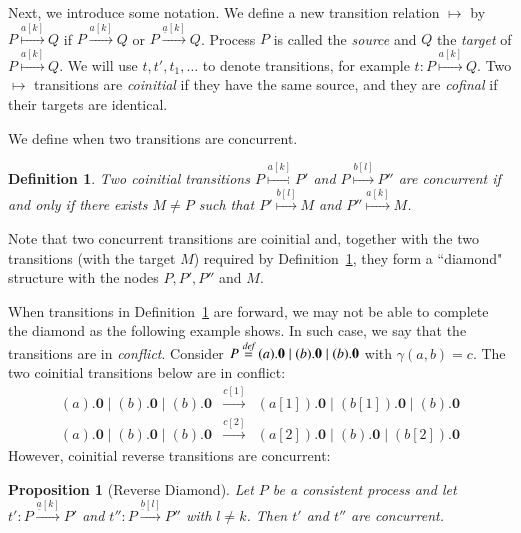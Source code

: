\documentclass[preprint,12pt]{elsarticle}
\newcommand{\paral}{\; \vert \;}
\newcommand{\Nil}{\mathbf{0}}
\newcommand{\bydef}{\stackrel{\emph{def}}{=}}
\newtheorem{definition}{Definition}
\newtheorem{proposition}{Proposition}
\begin{document}
Next, we introduce some notation. We define a new transition relation $ \longmapsto$ by
$P \stackrel{a[k]}{\longmapsto} Q$ if $P \xrightarrow{a[k]} Q$ or $P \xrightarrow{\underline{a}[k]} Q$.
Process $P$ is called the \emph{source} and $Q$ the \emph{target} of $P \stackrel{a[k]}{\longmapsto} Q$. 
We will use $t,t',t_1,\ldots$ to denote transitions, for example $t:P \stackrel{a[k]}{\longmapsto} Q$.
Two $\longmapsto$  transitions are \emph{coinitial} if they have the same source, and they are \emph{cofinal} 
if their targets are identical.

We define when two transitions are concurrent.
\begin{definition}\label{def:concurrent}
{\rm Two coinitial transitions $P \stackrel{a[k]}{\longmapsto} P'$ and 
$P \stackrel{b[l]}{\longmapsto} P''$ are \emph{concurrent} if and only if there exists $M\neq P$ such that 
$P' \stackrel{b[l]}{\longmapsto} M$ and $P'' \stackrel{a[k]}{\longmapsto} M$.}
\end{definition}
Note that two concurrent transitions are coinitial and, together with the two transitions (with 
the target $M$) required by Definition~\ref{def:concurrent}, they form a ``diamond" structure with the
nodes $P,P', P''$ and $M$.

When transitions in Definition~\ref{def:concurrent} are forward, we may not be able to complete the diamond
as the following example shows. In such case, we say that the transitions are in \emph{conflict}.
Consider $P\bydef (a).\Nil \paral (b).\Nil \paral (b).\Nil$ with $\gamma(a,b) = c$. The two coinitial
transitions below are in conflict:
\renewcommand{\arraystretch}{1}
$$\begin{array}{lll}
	(a).\Nil \paral (b).\Nil \paral (b).\Nil & \xrightarrow{c[1]} & (a[1]).\Nil \paral (b[1]).\Nil 
	\paral (b).\Nil \\
	(a).\Nil \paral (b).\Nil \paral (b).\Nil & \xrightarrow{c[2]} & (a[2]).\Nil \paral (b).\Nil 
	\paral (b[2]).\Nil
\end{array}$$
However, coinitial reverse transitions are concurrent:
\begin{proposition}[Reverse Diamond]\label{prop:revdiamond} Let $P$ be a consistent process and let
$t': P \xrightarrow{\underline{a}[k]} P'$ and $t'': P \xrightarrow{\underline{b}[l]} P''$  with $l \neq k $.
Then $t'$ and $t''$ are concurrent.
\end{proposition}
\end{document}
